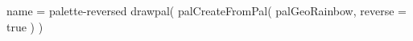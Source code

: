 \documentclass{standalone}
\begin{document}
\begin{luadraw*}{name = palette-reversed}
drawpal(
  palCreateFromPal(
    palGeoRainbow,
    {reverse = true}
  )
)
\end{luadraw*}
\end{document}
